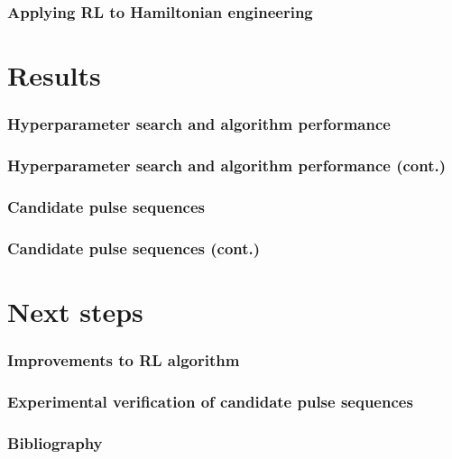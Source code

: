 \documentclass{beamer}
\begin{document}
\begin{frame}
\frametitle{Applying RL to Hamiltonian engineering}


\end{frame}

\section{Results}

\begin{frame}
\frametitle{Hyperparameter search and algorithm performance}
\end{frame}

\begin{frame}
\frametitle{Hyperparameter search and algorithm performance (cont.)}
\end{frame}

\begin{frame}
\frametitle{Candidate pulse sequences}


\end{frame}

\begin{frame}
\frametitle{Candidate pulse sequences (cont.)}
\end{frame}

\section{Next steps}

\begin{frame}
\frametitle{Improvements to RL algorithm}
\end{frame}

\begin{frame}
\frametitle{Experimental verification of candidate pulse sequences}
\end{frame}

\begin{frame}
\frametitle{Bibliography}

\printbibliography

\end{frame}
\end{document}
